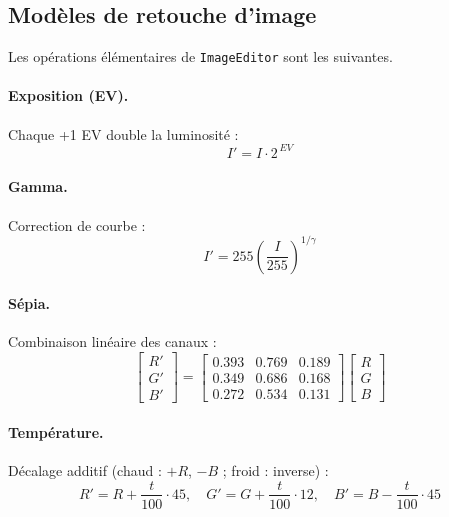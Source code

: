 \documentclass[11pt,a4paper]{article}
\begin{document}
\subsection{Modèles de retouche d'image}

Les opérations élémentaires de \texttt{ImageEditor} sont les suivantes.

\paragraph{Exposition (EV).}
Chaque +1 EV double la luminosité :
\begin{equation}
  I' = I \cdot 2^{\,EV}
  \label{eq:exposure}
\end{equation}

\paragraph{Gamma.}
Correction de courbe :
\begin{equation}
  I' = 255 \left( \frac{I}{255} \right)^{1/\gamma}
  \label{eq:gamma}
\end{equation}

\paragraph{Sépia.}
Combinaison linéaire des canaux :
\begin{equation}
  \begin{bmatrix} R' \\ G' \\ B' \end{bmatrix}
  = \begin{bmatrix}
    0.393 & 0.769 & 0.189 \\
    0.349 & 0.686 & 0.168 \\
    0.272 & 0.534 & 0.131
  \end{bmatrix}
  \begin{bmatrix} R \\ G \\ B \end{bmatrix}
  \label{eq:sepia}
\end{equation}

\paragraph{Température.}
Décalage additif (chaud : $+R$, $-B$ ; froid : inverse) :
\begin{equation}
  R' = R + \frac{t}{100}\cdot 45, \quad
  G' = G + \frac{t}{100}\cdot 12, \quad
  B' = B - \frac{t}{100}\cdot 45
  \label{eq:temperature}
\end{equation}
\end{document}
